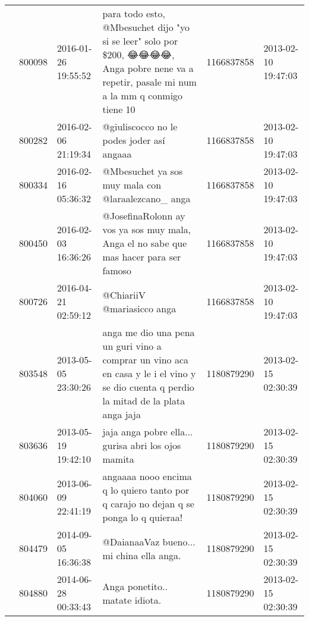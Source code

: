 \begin{tabular}{llllrl}
           & 800098  & 2016-01-26 19:55:52 &  para todo esto, @Mbesuchet dijo "yo si se leer" solo por \$200, 😂😂😂😂, Anga pobre nene va a repetir, pasale mi num a la mm q conmigo tiene 10 &  1166837858 & 2013-02-10 19:47:03 \\
           & 800282  & 2016-02-06 21:19:34 &                                                                                                    @giuliscocco no le podes joder así angaaa &  1166837858 & 2013-02-10 19:47:03 \\
           & 800334  & 2016-02-16 05:36:32 &                                                                                           @Mbesuchet ya sos muy mala con @laraalezcano\_ anga &  1166837858 & 2013-02-10 19:47:03 \\
           & 800450  & 2016-02-03 16:36:26 &                                                        @JosefinaRolonn ay vos ya sos muy mala, Anga el no sabe que mas hacer para ser famoso &  1166837858 & 2013-02-10 19:47:03 \\
           & 800726  & 2016-04-21 02:59:12 &                                                                                                                   @ChiariiV @mariasicco anga &  1166837858 & 2013-02-10 19:47:03 \\
           & 803548  & 2013-05-05 23:30:26 &       anga me dio una pena un guri vino a comprar un vino aca en casa y le i el vino y se dio cuenta q perdio la mitad de la plata anga jaja &  1180879290 & 2013-02-15 02:30:39 \\
           & 803636  & 2013-05-19 19:42:10 &                                                                                          jaja anga pobre ella... gurisa abri los ojos mamita &  1180879290 & 2013-02-15 02:30:39 \\
           & 804060  & 2013-06-09 22:41:19 &                                                         angaaaa nooo encima q lo quiero tanto por q carajo no dejan q se ponga lo q quieraa! &  1180879290 & 2013-02-15 02:30:39 \\
           & 804479  & 2014-09-05 16:36:38 &                                                                                                     @DaianaaVaz bueno... mi china ella anga. &  1180879290 & 2013-02-15 02:30:39 \\
           & 804880  & 2014-06-28 00:33:43 &                                                                                                               Anga ponetito.. matate idiota. &  1180879290 & 2013-02-15 02:30:39 \\

\end{tabular}
